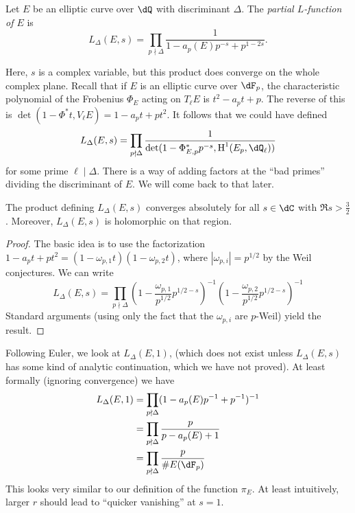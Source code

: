 \documentclass{article}
\begin{document}
\begin{definition}
Let $E$ be an elliptic curve over $\dQ$ with discriminant $\Delta$. The 
\emph{partial $L$-function of $E$} is 
\[
  L_\Delta(E,s) = \prod_{p\nmid \Delta} \frac{1}{1-a_p(E) p^{-s} + p^{1-2s}} \text{.}
\]
\end{definition}

Here, $s$ is a complex variable, but this product does converge on the whole 
complex plane. Recall that if $E$ is an elliptic curve over $\dF_p$, the 
characteristic polynomial of the Frobenius $\Phi_E$ acting on $T_\ell E$ is 
$t^2-a_p t + p$. The reverse of this is 
$\det(1-\Phi^\ast t,V_\ell E) = 1-a_p t + p t^2$. It follows that we could have 
defined 
\[
  L_\Delta(E,s) = \prod_{p\nmid \Delta} \frac{1}{\det(1-\Phi_{E,p}^\ast p^{-s}, \h^1(E_p,\dQ_\ell))}
\]
for some prime $\ell\mid \Delta$. There is a way of adding factors at the 
``bad primes'' dividing the discriminant of $E$. We will come back to that later. 

\begin{lemma}
The product defining $L_\Delta(E,s)$ converges absolutely for all $s\in \dC$ 
with $\Re s>\frac 3 2$. Moreover, $L_\Delta(E,s)$ is holomorphic on that 
region. 
\end{lemma}
\begin{proof}
The basic idea is to use the factorization 
$1-a_p t + p t^2 = (1-\omega_{p,1} t)(1-\omega_{p,2}t)$, where  
$|\omega_{p,i}| = p^{1/2}$ by the Weil conjectures. We can write  
\[
  L_\Delta(E,s) = \prod_{p\nmid \Delta} \left(1-\frac{\omega_{p,1}}{p^{1/2}} p^{1/2-s}\right)^{-1}\left( 1-\frac{\omega_{p,2}}{p^{1/2}} p^{1/2-s}\right)^{-1}
\]
Standard arguments (using only the fact that the $\omega_{p,i}$ are $p$-Weil) 
yield the result. 
\end{proof}

Following Euler, we look at $L_\Delta(E,1)$, (which does not exist unless 
$L_\Delta(E,s)$ has some kind of analytic continuation, which we have not 
proved). At least formally (ignoring convergence) we have 
\begin{align*}
  L_\Delta(E,1) &= \prod_{p\nmid \Delta} (1-a_p(E) p^{-1} + p^{-1})^{-1} \\
    &= \prod_{p\nmid \Delta} \frac{p}{p-a_p(E)+1} \\
    &= \prod_{p\nmid \Delta} \frac{p}{\# E(\dF_p)}
\end{align*}
This looks very similar to our definition of the function $\pi_E$. At least 
intuitively, larger $r$ should lead to ``quicker vanishing'' at $s=1$. 
\end{document}
